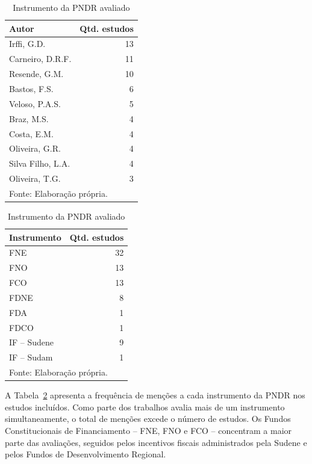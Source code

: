 \begin{table}[H]
\footnotesize
\renewcommand{\arraystretch}{1.2}
\centering
\begin{minipage}[t]{0.38\textwidth}
\caption{Top-10 autores (autorias e coautorias)}
\label{tab:autores-todos}
\begin{tabular}{lr}
\toprule
Autor & Qtd. estudos \\
\midrule
Irffi, G.D. & 13 \\
Carneiro, D.R.F. & 11 \\
Resende, G.M. & 10 \\
Bastos, F.S. & 6 \\
Veloso, P.A.S. & 5 \\
Braz, M.S. & 4 \\
Costa, E.M. & 4 \\
Oliveira, G.R. & 4 \\
Silva Filho, L.A. & 4 \\
Oliveira, T.G. & 3 \\
\bottomrule
\multicolumn{2}{l}{\footnotesize Fonte: Elaboração própria.} \\
\end{tabular}
\end{minipage}
\hfill
\begin{minipage}[t]{0.58\textwidth}
\centering
\caption{Instrumento da PNDR avaliado}
\label{tab:instrumentos}
\begin{tabular}{lr}
\toprule
Instrumento & Qtd. estudos \\
\midrule
FNE & 32 \\
FNO & 13 \\
FCO & 13 \\
FDNE & 8 \\
FDA & 1 \\
FDCO & 1 \\
IF -- Sudene & 9 \\
IF -- Sudam & 1 \\
\bottomrule
\multicolumn{2}{l}{\footnotesize Fonte: Elaboração própria.} \\
\end{tabular}
\end{minipage}
\end{table}

A Tabela~\ref{tab:instrumentos} apresenta a frequência de menções a cada instrumento da PNDR nos estudos incluídos. Como parte dos trabalhos avalia mais de um instrumento simultaneamente, o total de menções excede o número de estudos. Os Fundos Constitucionais de Financiamento -- FNE, FNO e FCO -- concentram a maior parte das avaliações, seguidos pelos incentivos fiscais administrados pela Sudene e pelos Fundos de Desenvolvimento Regional.


